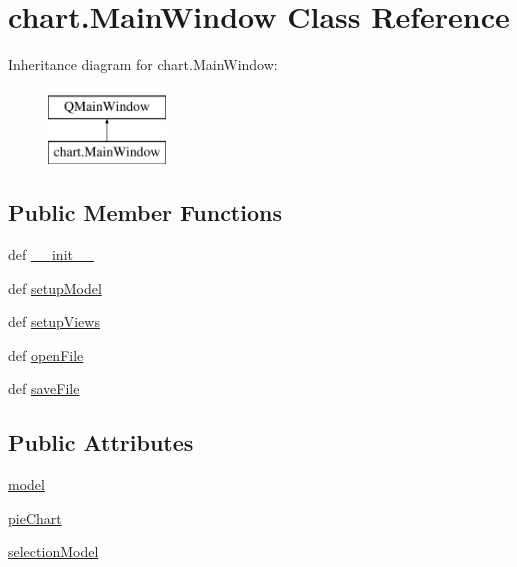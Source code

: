\hypertarget{classchart_1_1MainWindow}{}\section{chart.\+Main\+Window Class Reference}
\label{classchart_1_1MainWindow}
Inheritance diagram for chart.\+Main\+Window\+:\begin{figure}[H]
\begin{center}
\leavevmode
\includegraphics[height=2.000000cm]{classchart_1_1MainWindow}
\end{center}
\end{figure}
\subsection*{Public Member Functions}
\begin{DoxyCompactItemize}
\item 
def \hyperlink{classchart_1_1MainWindow_a5bdb109d7158db060b279a1515f16103}{\+\_\+\+\_\+init\+\_\+\+\_\+}
\item 
def \hyperlink{classchart_1_1MainWindow_aeb80e4102a3e96bfd006eae3edeb5abc}{setup\+Model}
\item 
def \hyperlink{classchart_1_1MainWindow_ac303a262b7e64512f8ee7297cae6d196}{setup\+Views}
\item 
def \hyperlink{classchart_1_1MainWindow_a6cf4ecd7b18bbaaf6937de4c698afe5f}{open\+File}
\item 
def \hyperlink{classchart_1_1MainWindow_a7c0e80fff6d16e39e3a01879ec7b7a27}{save\+File}
\end{DoxyCompactItemize}
\subsection*{Public Attributes}
\begin{DoxyCompactItemize}
\item 
\hyperlink{classchart_1_1MainWindow_a122790a846eb7f4dfe680acd461c485a}{model}
\item 
\hyperlink{classchart_1_1MainWindow_adc5606b051b5a766f74297fc0d199415}{pie\+Chart}
\item 
\hyperlink{classchart_1_1MainWindow_a7cb915d8f2defed78220e890f815298f}{selection\+Model}
\end{DoxyCompactItemize}


